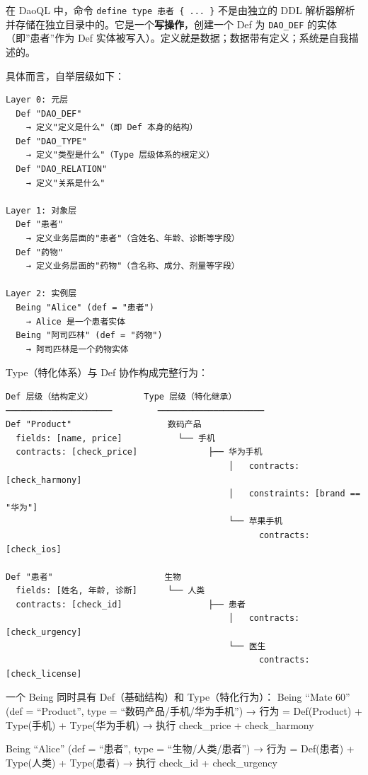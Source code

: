 \documentclass[11pt,a4paper]{ctexart}
\begin{document}
在 DaoQL 中，命令 \texttt{define\ type\ 患者\ \{\ ...\ \}} 不是由独立的
DDL 解析器解析并存储在独立目录中的。它是一个\textbf{写操作}，创建一个
Def 为 \texttt{DAO\_DEF} 的实体（即''患者''作为 Def
实体被写入）。定义就是数据；数据带有定义；系统是自我描述的。

具体而言，自举层级如下：

\begin{verbatim}
Layer 0: 元层
  Def "DAO_DEF"
    → 定义"定义是什么"（即 Def 本身的结构）
  Def "DAO_TYPE"
    → 定义"类型是什么"（Type 层级体系的根定义）
  Def "DAO_RELATION"
    → 定义"关系是什么"

Layer 1: 对象层
  Def "患者"
    → 定义业务层面的"患者"（含姓名、年龄、诊断等字段）
  Def "药物"
    → 定义业务层面的"药物"（含名称、成分、剂量等字段）

Layer 2: 实例层
  Being "Alice" (def = "患者")
    → Alice 是一个患者实体
  Being "阿司匹林" (def = "药物")
    → 阿司匹林是一个药物实体
\end{verbatim}

Type（特化体系）与 Def 协作构成完整行为：

\begin{verbatim}
Def 层级（结构定义）          Type 层级（特化继承）
─────────────────────         ─────────────────────
Def "Product"                   数码产品
  fields: [name, price]           └── 手机
  contracts: [check_price]              ├── 华为手机
                                            │   contracts: [check_harmony]
                                            │   constraints: [brand == "华为"]
                                            └── 苹果手机
                                                  contracts: [check_ios]

Def "患者"                      生物
  fields: [姓名, 年龄, 诊断]      └── 人类
  contracts: [check_id]                 ├── 患者
                                            │   contracts: [check_urgency]
                                            └── 医生
                                                  contracts: [check_license]
\end{verbatim}

一个 Being 同时具有 Def（基础结构）和 Type（特化行为）： Being ``Mate
60'' (def = ``Product'', type = ``数码产品/手机/华为手机'') → 行为 =
Def(Product) + Type(手机) + Type(华为手机) → 执行 check\_price +
check\_harmony

Being ``Alice'' (def = ``患者'', type = ``生物/人类/患者'') → 行为 =
Def(患者) + Type(人类) + Type(患者) → 执行 check\_id + check\_urgency
\end{document}
